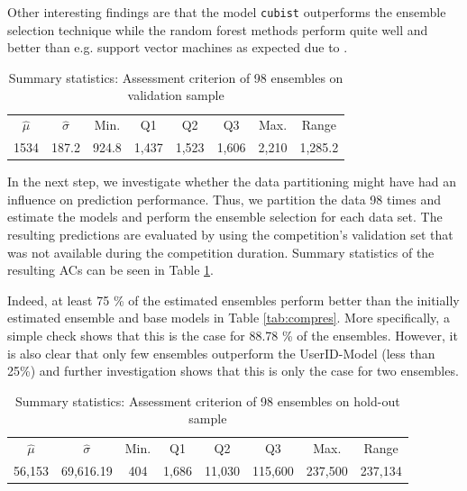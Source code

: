 \documentclass[12pt]{article}
\begin{document}
Other interesting findings are that the model \texttt{cubist} outperforms the ensemble selection technique while the random forest methods perform quite well and better than e.g. support vector machines as expected due to \cite{Fernandez-Delgado2014}.\\
\begin{table}[ht]
	\centering
	\begin{tabular}{cccccccc}
		\hline
		\hline
		$\hat{\mu}$ &  $\hat{\sigma}$ & Min. & Q1  & Q2 & Q3       & Max.  & Range\\ 
		1534        &      187.2      & 924.8 & 1,437 & 1,523 & 1,606 & 2,210 & 1,285.2\\ 
		\hline
		\hline
	\end{tabular}
	\vspace{-5pt}
	\caption{Summary statistics: Assessment criterion of 98 ensembles on validation sample}
	\label{tab:sumes}
\end{table}
In the next step, we investigate whether the data partitioning might have had an influence on prediction performance. Thus, we partition the data 98 times and estimate the models and perform the ensemble selection for each data set. The resulting predictions are evaluated by using the competition's validation set that was not available during the competition duration. Summary statistics of the resulting ACs can be seen in Table \ref{tab:sumes}.

Indeed, at least 75 \% of the estimated ensembles perform better than the initially estimated ensemble and base models in Table \ref{tab:compres}. More specifically, a simple check shows that this is the case for 88.78 \% of the ensembles.
However, it is also clear that only few ensembles outperform the UserID-Model (less than 25\%) and further investigation shows that this is only the case for two ensembles. \\
\begin{table}[ht]
	\centering
	\begin{tabular}{cccccccc}
		\hline
		\hline
		$\hat{\mu}$ &  $\hat{\sigma}$ & Min. & Q1  & Q2 & Q3       & Max.  & Range\\ 
		56,153        &      69,616.19     & 404 & 1,686 & 11,030 & 115,600 & 237,500 & 237,134\\ 
		\hline
		\hline
	\end{tabular}
	\vspace{-5pt}
	\caption{Summary statistics: Assessment criterion of 98 ensembles on hold-out sample}
	\label{tab:sumhold}
\end{table}
\end{document}

